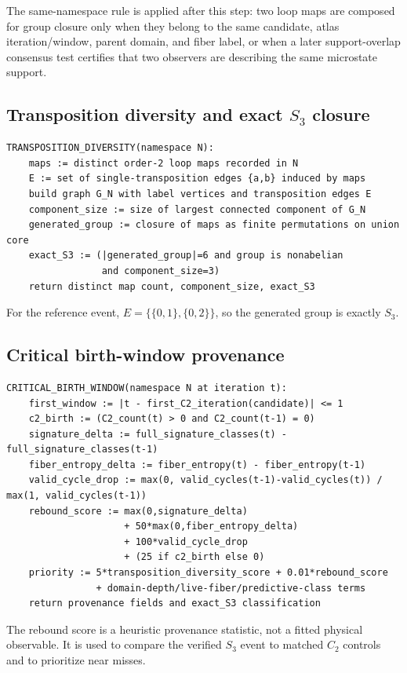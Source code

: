 \documentclass[11pt]{article}
\begin{document}
The same-namespace rule is applied after this step: two loop maps are composed for group closure only when they belong to the same candidate, atlas iteration/window, parent domain, and fiber label, or when a later support-overlap consensus test certifies that two observers are describing the same microstate support.

\subsection{Transposition diversity and exact $S_3$ closure}
\begin{lstlisting}
TRANSPOSITION_DIVERSITY(namespace N):
    maps := distinct order-2 loop maps recorded in N
    E := set of single-transposition edges {a,b} induced by maps
    build graph G_N with label vertices and transposition edges E
    component_size := size of largest connected component of G_N
    generated_group := closure of maps as finite permutations on union core
    exact_S3 := (|generated_group|=6 and group is nonabelian
                 and component_size=3)
    return distinct map count, component_size, exact_S3
\end{lstlisting}

For the reference event, $E=\{\{0,1\},\{0,2\}\}$, so the generated group is exactly $S_3$.

\subsection{Critical birth-window provenance}
\begin{lstlisting}
CRITICAL_BIRTH_WINDOW(namespace N at iteration t):
    first_window := |t - first_C2_iteration(candidate)| <= 1
    c2_birth := (C2_count(t) > 0 and C2_count(t-1) = 0)
    signature_delta := full_signature_classes(t) - full_signature_classes(t-1)
    fiber_entropy_delta := fiber_entropy(t) - fiber_entropy(t-1)
    valid_cycle_drop := max(0, valid_cycles(t-1)-valid_cycles(t)) / max(1, valid_cycles(t-1))
    rebound_score := max(0,signature_delta)
                     + 50*max(0,fiber_entropy_delta)
                     + 100*valid_cycle_drop
                     + (25 if c2_birth else 0)
    priority := 5*transposition_diversity_score + 0.01*rebound_score
                + domain-depth/live-fiber/predictive-class terms
    return provenance fields and exact_S3 classification
\end{lstlisting}

The rebound score is a heuristic provenance statistic, not a fitted physical observable.  It is used to compare the verified $S_3$ event to matched $C_2$ controls and to prioritize near misses.
\end{document}
